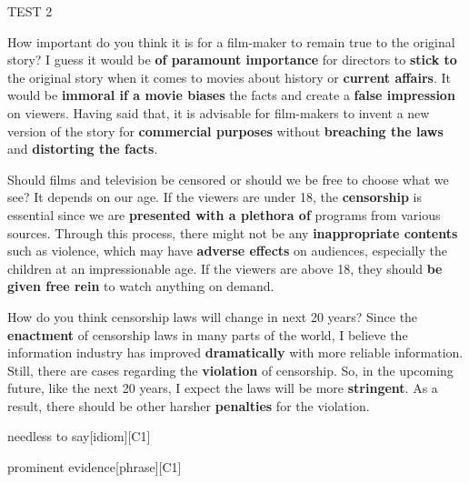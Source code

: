 \begin{glossarymc}[Cambridge 3]
\begin{test}{TEST 2}
\begin{qa}{How important do you think it is for a film-maker to remain true to the original story?}
I guess it would be \textbf{of paramount importance} for directors to \textbf{stick to} the original story when it comes to movies about history or \textbf{current affairs}. It would be \textbf{immoral if a movie biases} the facts and create a \textbf{false impression} on viewers. Having said that, it is advisable for film-makers to invent a new version of the story for \textbf{commercial purposes} without \textbf{breaching the laws} and \textbf{distorting the facts}.
\end{qa}

\begin{qa}{Should films and television be censored or should we be free to choose what we see?}
It depends on our age. If the viewers are under 18, the \textbf{censorship} is essential since we are \textbf{presented with a plethora of} programs from various sources. Through this process, there might not be any \textbf{inappropriate contents} such as violence, which may have \textbf{adverse effects} on audiences, especially the children at an impressionable age. If the viewers are above 18, they should \textbf{be given free rein} to watch anything on demand.
\end{qa}

\begin{qa}{How do you think censorship laws will change in next 20 years?}
Since the \textbf{enactment} of censorship laws in many parts of the world, I believe the information industry has improved \textbf{dramatically} with more reliable information. Still, there are cases regarding the \textbf{violation} of censorship. So, in the upcoming future, like the next 20 years, I expect the laws will be more \textbf{stringent}. As a result, there should be other harsher \textbf{penalties} for the violation.
\end{qa}

\begin{VocabExplain}[Part 3]
    \begin{ExplainCard}{needless to say}[idiom][C1]
\end{ExplainCard}

\begin{ExplainCard}{prominent evidence}[phrase][C1]
\end{ExplainCard}


\end{VocabExplain}
\end{test}
\end{glossarymc}
